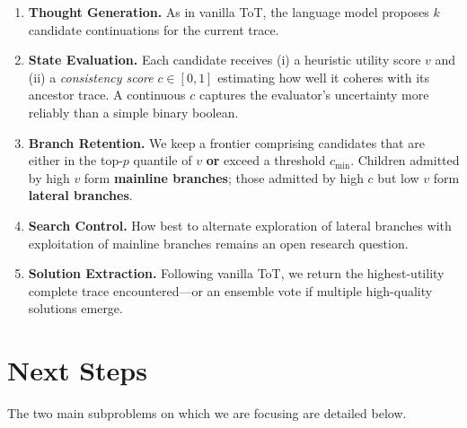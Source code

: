 \documentclass[onecolumn]{IEEEtran}
\begin{document}
\begin{enumerate}
   \item
      \textbf{Thought Generation.}
      As in vanilla ToT, the language model proposes $k$ candidate continuations for the current trace.
   \item
      \textbf{State Evaluation.}
      Each candidate receives (i) a heuristic utility score $v$ and (ii) a \textit{consistency score} $c \in [0, 1]$ estimating how well it coheres with its ancestor trace.
      A continuous $c$ captures the evaluator's uncertainty more reliably than a simple binary boolean.
   \item
      \textbf{Branch Retention.}
      We keep a frontier comprising candidates that are either in the top-$p$ quantile of $v$ \textbf{or} exceed a threshold $c_{\text{min}}$.
      Children admitted by high $v$ form \textbf{mainline branches}; those admitted by high $c$ but low $v$ form \textbf{lateral branches}.
   \item
      \textbf{Search Control.}
      How best to alternate exploration of lateral branches with exploitation of mainline branches remains an open research question.
   \item
      \textbf{Solution Extraction.}
      Following vanilla ToT, we return the highest-utility complete trace encountered---or an ensemble vote if multiple high-quality solutions emerge.
\end{enumerate}


\section{Next Steps}
\label{section:next-steps}
The two main subproblems on which we are focusing are detailed below.
\end{document}
